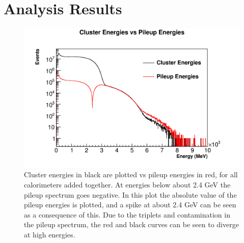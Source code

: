 \graphicspath{ {Figures/Pileup/} }

\chapter{Analysis Results}

\begin{figure}[]
	\centering
	\includegraphics[width=\textwidth]{ClusterEnergiesVsPileupEnergies}
    \caption[ClusterEnergiesVsPileupEnergies]{Cluster energies in black are plotted vs pileup energies in red, for all calorimeters added together. At energies below about 2.4 GeV the pileup spectrum goes negative. In this plot the absolute value of the pileup energies is plotted, and a spike at about 2.4 GeV can be seen as a consequence of this. Due to the triplets and contamination in the pileup spectrum, the red and black curves can be seen to diverge at high energies.}    
    \label{fig:ClusterEnergiesVsPileupEnergies}
\end{figure}

